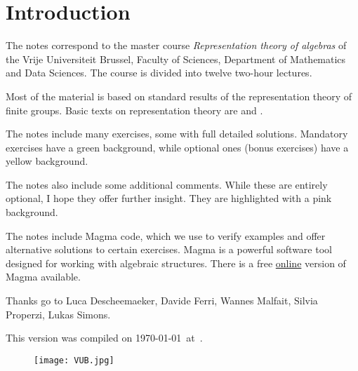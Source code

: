 \thispagestyle{plain}
\section*{Introduction}

The notes correspond to the master  
course \emph{Representation theory of algebras} of the 
Vrije Universiteit Brussel, 
Faculty of Sciences, 
Department of Mathematics and Data Sciences. The course
is divided into twelve two-hour lectures. 

Most of the material is based on standard 
results of the representation theory of finite groups. 
Basic texts on representation theory are \cite{MR1369573} 
and \cite{MR2270898}. 

The notes include many exercises, some with full detailed solutions. Mandatory exercises have a \colorbox{green!5!white}{green background}, while optional ones
(bonus exercises) have a \colorbox{yellow!15!white}{yellow background}.

The notes also include some additional comments. While these are entirely optional, I hope they offer further insight. They are highlighted with a \colorbox{red!5!white}{pink background}.

The notes include Magma code, which we use to verify examples and offer alternative solutions to certain exercises. Magma \cite{zbMATH01077111} is a powerful software tool designed for working with algebraic structures. There is a free \href{https://magma.maths.usyd.edu.au/calc/}{online} version of Magma available.


Thanks go to Luca Descheemaeker, Davide Ferri, 
Wannes Malfait, Silvia Properzi, Lukas Simons.  



This version 
was compiled on \today~at~\currenttime.


 \begin{figure}[b]
     \texttt{[image: VUB.jpg]}
 \end{figure}